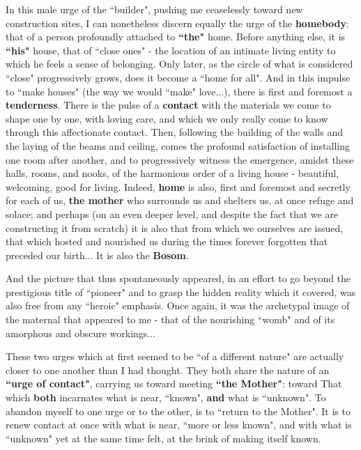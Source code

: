 In this male urge of the ``builder", pushing me ceaselessly toward new construction sites, I can nonetheless discern equally the urge of the \textbf{homebody}: that of a person profoundly attached to \textbf{``the"} home. Before anything else, it is \textbf{``his"} house, that of ``close ones" - the location of an intimate living entity to which he feels a sense of belonging. Only later, as the circle of what is considered ``close" progressively grows, does it become a ``home for all". And in this impulse to ``make houses" (the way we would ``make" love...), there is first and foremost a \textbf{tenderness}. There is the pulse of a \textbf{contact} with the materials we come to shape one by one, with loving care, and which we only really come to know through this affectionate contact. Then, following the building of the walls and the laying of the beams and ceiling, comes the profound satisfaction of installing one room after another, and to progressively witness the emergence, amidst these halls, rooms, and nooks, of the harmonious order of a living house - beautiful, welcoming, good for living. Indeed, \textbf{home} is also, first and foremost and secretly for  each of us, \textbf{the mother} who surrounds us and shelters us, at once refuge and solace; and perhaps (on an even deeper level, and despite the fact that we are constructing it from scratch) it is also that from which we ourselves are issued, that which hosted and nourished us during the times forever forgotten that preceded our birth... It is also the \textbf{Bosom}.

And the picture that thus spontaneously appeared, in an effort to go beyond the prestigious title of ``pioneer" and to grasp the hidden reality which it covered, was also free from any ``heroic" emphasis. Once again, it was the archetypal image of the maternal that appeared to me - that of the nourishing ``womb" and of its amorphous and obscure workings...

These two urges which at first seemed to be ``of a different nature" are actually closer to one another than I had thought. They both share the nature of an \textbf{``urge of contact"}, carrying us toward meeting \textbf{``the Mother"}: toward That which \textbf{both} incarnates what is near, ``known", \textbf{and} what is ``unknown". To abandon myself to one urge or to the other, is to ``return to the Mother". It is to renew contact at once with what is near, ``more or less known", and with what is ``unknown" yet at the same time felt, at the brink of making itself known.

